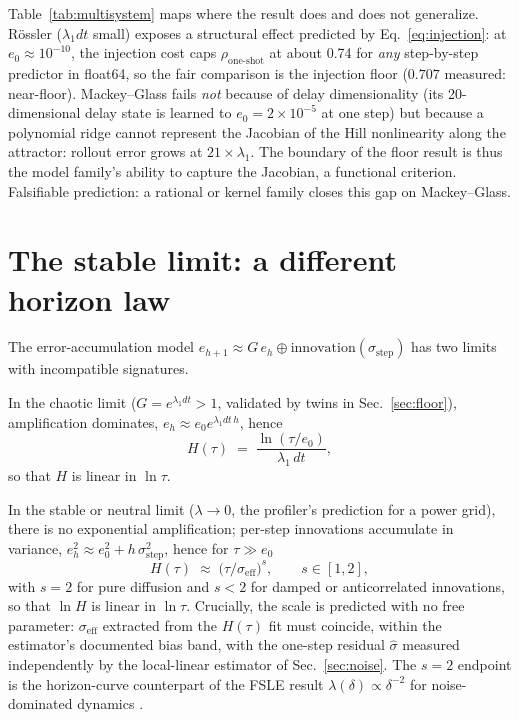 \documentclass[aps,pre,twocolumn,superscriptaddress,nofootinbib,longbibliography]{revtex4-2}
\newcommand{\eff}{\mathrm{eff}}
\begin{document}
Table~\ref{tab:multisystem} maps where the result does and does not
generalize. R\"ossler ($\lambda_1 dt$ small) exposes a structural effect
predicted by Eq.~\eqref{eq:injection}: at $e_0 \approx 10^{-10}$, the
injection cost caps $\rho_{\text{one-shot}}$ at about 0.74 for \emph{any}
step-by-step predictor in float64, so the fair comparison is the
injection floor ($0.707$ measured: near-floor). Mackey--Glass fails
\emph{not} because of delay dimensionality (its 20-dimensional delay
state is learned to $e_0 = 2\times 10^{-5}$ at one step) but because a
polynomial ridge cannot represent the Jacobian of the Hill nonlinearity
along the attractor: rollout error grows at $21\times\lambda_1$. The
boundary of the floor result is thus the model family's ability to
capture the Jacobian, a functional criterion. Falsifiable prediction: a
rational or kernel family closes this gap on Mackey--Glass.

\section{The stable limit: a different horizon law}
\label{sec:stable}

The error-accumulation model $e_{h+1} \approx G\,e_h \oplus
\mathrm{innovation}(\sigma_{\mathrm{step}})$ has two limits with
incompatible signatures.

In the chaotic limit ($G = e^{\lambda_1 dt} > 1$, validated by twins in
Sec.~\ref{sec:floor}), amplification dominates,
$e_h \approx e_0 e^{\lambda_1 dt\,h}$, hence
\begin{equation}
H(\tau) \;=\; \frac{\ln(\tau/e_0)}{\lambda_1\,dt},
\label{eq:chaoticlaw}
\end{equation}
so that $H$ is linear in $\ln\tau$.

In the stable or neutral limit ($\lambda \to 0$, the profiler's
prediction for a power grid), there is no exponential amplification;
per-step innovations accumulate in variance,
$e_h^2 \approx e_0^2 + h\,\sigma_{\mathrm{step}}^2$, hence for
$\tau \gg e_0$
\begin{equation}
H(\tau) \;\approx\; \big(\tau/\sigma_\eff\big)^{s}, \qquad
s \in [1,2],
\label{eq:powerlaw}
\end{equation}
with $s = 2$ for pure diffusion and $s < 2$ for damped or anticorrelated
innovations, so that $\ln H$ is linear in $\ln\tau$. Crucially, the scale
is predicted with no free parameter: $\sigma_\eff$ extracted from the
$H(\tau)$ fit must coincide, within the estimator's documented bias band,
with the one-step residual $\hat\sigma$ measured independently by the
local-linear estimator of Sec.~\ref{sec:noise}. The $s = 2$ endpoint is
the horizon-curve counterpart of the FSLE result
$\lambda(\delta) \propto \delta^{-2}$ for noise-dominated dynamics
\citep{aurell1997predictability}.
\end{document}
